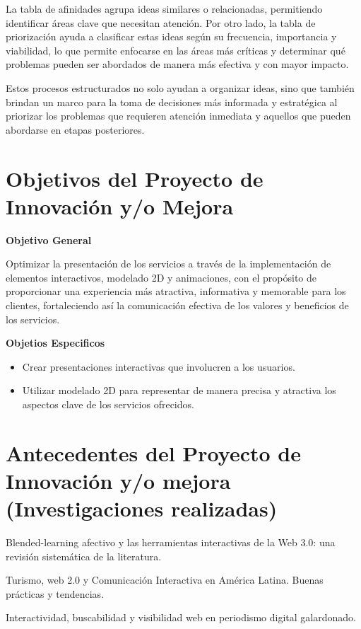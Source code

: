 La tabla de afinidades agrupa ideas similares o relacionadas, permitiendo identificar áreas clave que necesitan atención. Por otro lado, la tabla de priorización ayuda a clasificar estas ideas según su frecuencia, importancia y viabilidad, lo que permite enfocarse en las áreas más críticas y determinar qué problemas pueden ser abordados de manera más efectiva y con mayor impacto.

Estos procesos estructurados no solo ayudan a organizar ideas, sino que también brindan un marco para la toma de decisiones más informada y estratégica al priorizar los problemas que requieren atención inmediata y aquellos que pueden abordarse en etapas posteriores.

\section{Objetivos del Proyecto de Innovación y/o Mejora}

\textbf{Objetivo General}

Optimizar la presentación de los servicios a través de la implementación de elementos interactivos,
modelado 2D y animaciones, con el propósito de proporcionar una experiencia más atractiva,
informativa y memorable para los clientes, fortaleciendo así la comunicación efectiva de los
valores y beneficios de los servicios.

\textbf{Objetios Especificos}

\begin{itemize}
\item Crear presentaciones interactivas que involucren a los usuarios. 
\item Utilizar modelado 2D para representar de manera precisa y atractiva los aspectos clave de los servicios ofrecidos. 
\end{itemize}

\section{Antecedentes del Proyecto de Innovación y/o mejora (Investigaciones realizadas)}

\cite{lizarraga2014blended} Blended-learning afectivo y las herramientas interactivas de la Web 3.0: una revisión sistemática de la literatura.

\cite{cordova2017turismo} Turismo, web 2.0 y Comunicación Interactiva en América Latina. Buenas prácticas y tendencias.

\cite{santos2023interactividad} Interactividad, buscabilidad y visibilidad web en periodismo digital galardonado.
   
